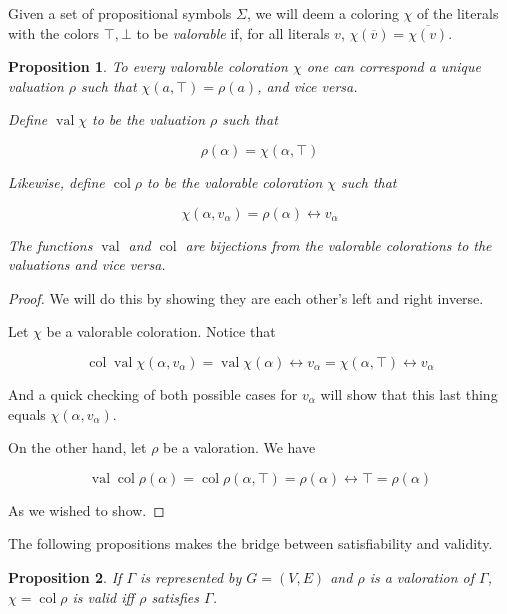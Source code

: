 \documentclass[11pt]{article}
\newcommand{\conj}[1]{\overline{#1}}
\DeclareMathOperator{\val}{val}
\DeclareMathOperator{\col}{col}
\newtheorem{prop}{Proposition}
\begin{document}
Given a set of propositional symbols $\Sigma$, we will deem a coloring $\chi$ of the literals with the colors $\top, \bot$ to be \emph{valorable} if, for all literals $v$, $\chi(\conj v) = \conj{\chi(v)}$.

\begin{prop}
To every valorable coloration $\chi$ one can correspond a unique valuation $\rho$ such that $\chi(a, \top) = \rho(a)$, and vice versa.

Define $\val \chi$ to be the valuation $\rho$ such that

\[\rho(\alpha) = \chi(\alpha, \top)\]

Likewise, define $\col \rho$ to be the valorable coloration $\chi$ such that

\[\chi(\alpha, v_\alpha) = \rho(\alpha) \leftrightarrow v_\alpha\]

The functions $\val$ and $\col$ are bijections from the valorable colorations to the valuations and vice versa.
\end{prop}

\begin{proof}
We will do this by showing they are each other's left and right inverse.

Let $\chi$ be a valorable coloration. Notice that

\[\col \val \chi (\alpha, v_\alpha) = \val \chi (\alpha) \leftrightarrow v_\alpha = \chi(\alpha, \top) \leftrightarrow v_\alpha\]

And a quick checking of both possible cases for $v_\alpha$ will show that this last thing equals $\chi(\alpha, v_\alpha)$.

On the other hand, let $\rho$ be a valoration. We have

\[\val \col \rho(\alpha) = \col \rho (\alpha, \top) = \rho(\alpha) \leftrightarrow \top = \rho(\alpha) \]

As we wished to show.
\end{proof}

The following propositions makes the bridge between satisfiability and validity.

\begin{prop}
If $\Gamma$ is represented by $G = (V,E)$ and $\rho$ is a valoration of $\Gamma$, $\chi = \col \rho$ is valid iff $\rho$ satisfies $\Gamma$.
\end{prop}
\end{document}
